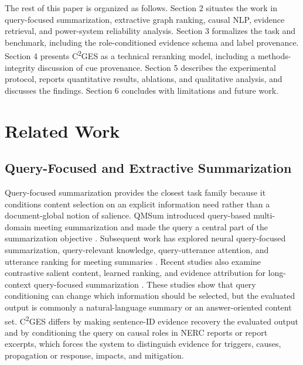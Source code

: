 \documentclass{article}
\begin{document}
The rest of this paper is organized as follows. Section 2 situates the work in query-focused summarization, extractive graph ranking, causal NLP, evidence retrieval, and power-system reliability analysis. Section 3 formalizes the task and benchmark, including the role-conditioned evidence schema and label provenance. Section 4 presents C\textsuperscript{2}GES as a technical reranking model, including a methods-integrity discussion of cue provenance. Section 5 describes the experimental protocol, reports quantitative results, ablations, and qualitative analysis, and discusses the findings. Section 6 concludes with limitations and future work.

\section{Related Work}
\label{sec:related_work}

\subsection{Query-Focused and Extractive Summarization}
\label{sec:query_focused}

Query-focused summarization provides the closest task family because it conditions content selection on an explicit information need rather than a document-global notion of salience. QMSum introduced query-based multi-domain meeting summarization and made the query a central part of the summarization objective \cite{zhong2021qmsum}. Subsequent work has explored neural query-focused summarization, query-relevant knowledge, query-utterance attention, and utterance ranking for meeting summaries \cite{vig2022exploring,yu2023improving,liu2023queryutterance,liu2023rank}. Recent studies also examine contrastive salient content, learned ranking, and evidence attribution for long-context query-focused summarization \cite{sotudeh2023qontsum,sotudeh2024rank,wright2025unstructured}. These studies show that query conditioning can change which information should be selected, but the evaluated output is commonly a natural-language summary or an answer-oriented content set. C\textsuperscript{2}GES differs by making sentence-ID evidence recovery the evaluated output and by conditioning the query on causal roles in NERC reports or report excerpts, which forces the system to distinguish evidence for triggers, causes, propagation or response, impacts, and mitigation.
\end{document}

